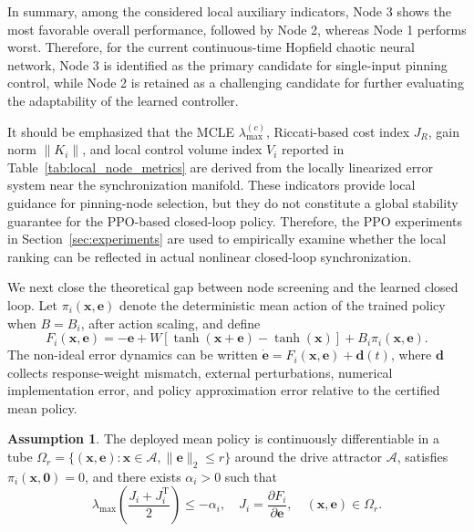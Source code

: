 \documentclass[10pt,twocolumn]{article}
\newcommand{\rev}[1]{{\color{revisionblue}#1}}
\theoremstyle{definition}
\newtheorem{assumption}{Assumption}
\begin{document}
In summary, among the considered local auxiliary indicators, Node 3 shows the most favorable overall performance, followed by Node 2, whereas Node 1 performs worst. Therefore, for the current continuous-time Hopfield chaotic neural network, Node 3 is identified as the primary candidate for single-input pinning control, while Node 2 is retained as a challenging candidate for further evaluating the adaptability of the learned controller.

It should be emphasized that the MCLE $\lambda_{\max}^{(c)}$, Riccati-based cost index $J_R$, gain norm $\|K_i\|$, and local control volume index $V_i$ reported in Table~\ref{tab:local_node_metrics} are derived from the locally linearized error system near the synchronization manifold. These indicators provide local guidance for pinning-node selection, but they do not constitute a global stability guarantee for the PPO-based closed-loop policy. Therefore, the PPO experiments in Section~\ref{sec:experiments} are used to empirically examine whether the local ranking can be reflected in actual nonlinear closed-loop synchronization.

\rev{We next close the theoretical gap between node screening and the learned closed loop. Let $\pi_i(\mathbf{x},\mathbf{e})$ denote the deterministic mean action of the trained policy when $B=B_i$, after action scaling, and define
\begin{equation}
F_i(\mathbf{x},\mathbf{e})=-\mathbf{e}+W[\tanh(\mathbf{x}+\mathbf{e})-\tanh(\mathbf{x})]+B_i\pi_i(\mathbf{x},\mathbf{e}).
\label{eq:closed_loop_nominal}
\end{equation}
The non-ideal error dynamics can be written $\dot{\mathbf e}=F_i(\mathbf{x},\mathbf e)+\mathbf d(t)$, where $\mathbf d$ collects response-weight mismatch, external perturbations, numerical implementation error, and policy approximation error relative to the certified mean policy.}

\begin{assumption}\label{ass:policy_certificate}
\rev{The deployed mean policy is continuously differentiable in a tube $\Omega_r=\{(\mathbf{x},\mathbf e):\mathbf{x}\in\mathcal A,\|\mathbf e\|_2\le r\}$ around the drive attractor $\mathcal A$, satisfies $\pi_i(\mathbf{x},\mathbf0)=0$, and there exists $\alpha_i>0$ such that
\begin{equation}
\lambda_{\max}\!\left(\frac{J_i+J_i^{\mathrm T}}{2}\right)\le-\alpha_i,
\quad J_i=\frac{\partial F_i}{\partial\mathbf e},
\quad (\mathbf{x},\mathbf e)\in\Omega_r.
\label{eq:jacobian_certificate}
\end{equation}}
\end{assumption}
\end{document}
